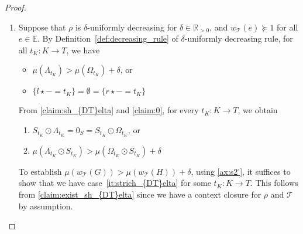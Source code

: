 \begin{proof}
\begin{enumerate}
        \item  
            Suppose that $\rho$ is $\delta$-uniformly decreasing for $\delta \mathop{\in} \mathbb{R}_{>0}$, and $w_\mathcal{T}(e) \mathop{\succeq} 1$ for all $e \mathop{\in} \mathbb{E}$. By Definition~\ref{def:decreasing_rule} of $\delta$-uniformly decreasing rule,
            for all $t_K : K \mathop{\to} T$, we have  
                            \begin{itemize}                                
                                \item $\mu(\Lambda_{t_K}) \mathop{>} \mu(\Omega_{t_K})\mathop{+}\delta$,
                                 or
                                \item $\{l \mathop{\star} - \mathop{=} t_K\} \mathop{=} \emptyset \mathop{=} \{r \mathop{\star} - \mathop{=} t_K\}$
                            \end{itemize}
            From \ref{claim:sh_{DT}elta} and \ref{claim:0}, for every \( t_K: K \mathop{\rightarrow} T \), we obtain
            \begin{enumerate}[label=(\roman*)]
                \item $S_{t_K} \mathop{\odot} \Lambda_{t_K} \mathop{=} 0_S \mathop{=}  S_{t_K} \mathop{\odot} \Omega_{t_K}$, or
                \item  \label{it:strich_{DT}elta}  $\mu(\Lambda_{t_K} \mathop{\odot} S_{t_K}) \mathop{>} \mu(\Omega_{t_K} \mathop{\odot} S_{t_K})\mathop{+}\delta$
            \end{enumerate}
            To establish $ \mu(w_\mathcal{T}(G)) \mathop{>} \mu(w_\mathcal{T}(H))\mathop{+}\delta$, using \eqref{ax:s2'}, 
            it suffices to show that we have case~\ref{it:strich_{DT}elta} for some $t_K : K \mathop{\to} T$.
            This follows from \ref{claim:exist_sh_{DT}elta} since we have a context closure for $\rho$ and $\mathcal{T}$ by assumption.

\end{enumerate}
\end{proof}
